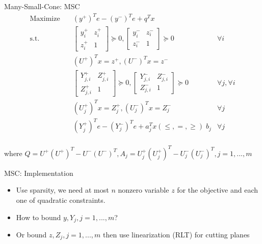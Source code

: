\begin{frame}{Many-Small-Cone: MSC}
  \begin{equation}
    \begin{aligned}
      \mathrm{Maximize}\quad              & (y^+)^Te - (y^-)^Te + q^Tx                                        \\
      \mathrm{s.t.} \quad                 & \begin{bmatrix}y^+_i & z^+_i \\ z^+_i & 1 \end{bmatrix} \succeq 0,
      \begin{bmatrix}y^-_i & z^-_i \\ z^-_i & 1 \end{bmatrix} \succeq 0 & \forall i                                                         \\
                                          & (U^+)^Tx = z^+, (U^-)^Tx = z^-                                    \\
                                          & \begin{bmatrix}Y^+_{j, i} & Z^+_{j, i}\\ Z^+_{j, i} & 1 \end{bmatrix} \succeq 0,
      \begin{bmatrix} Y^-_{j, i} & Z^-_{j, i} \\ Z^-_{j, i} & 1 \end{bmatrix} \succeq 0 & \forall j, \forall i                                              \\
                                          & (U^+_j)^Tx = Z^+_j, (U^-_j)^Tx = Z^-_j                & \forall j \\
                                          & (Y^+_j)^Te - (Y^-_j)^Te + a_j^Tx (\le, =, \ge) \; b_j & \forall j \\
    \end{aligned}
  \end{equation}

  where \(Q =  U^+ (U^+)^T - U^- (U^-)^T, A_j = U^+_j (U^+_j)^T - U^-_j (U^-_j)^T, j = 1,...,m\)
\end{frame}
\begin{frame}{MSC: Implementation}
  \begin{itemize}
    \item Use sparsity, we need at most \(n\) nonzero variable \(z\) for the objective and each one of quadratic constraints.
    \item How to bound \(y, Y_j, j = 1,...,m\)?
    \item Or bound \(z, Z_j, j = 1,...,m\) then use linearization (RLT) for cutting planes
  \end{itemize}
\end{frame}


